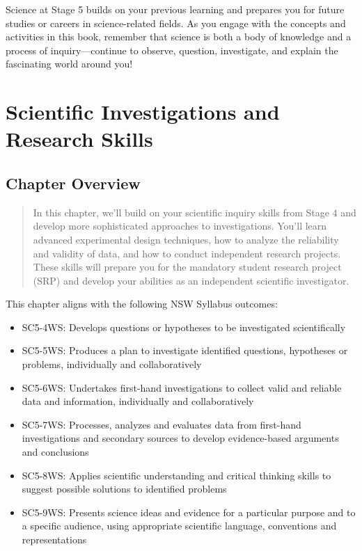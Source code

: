 \documentclass[justified,notoc]{tufte-book}
\begin{document}
Science at Stage 5 builds on your previous learning and prepares you for future studies or careers in science-related fields. As you engage with the concepts and activities in this book, remember that science is both a body of knowledge and a process of inquiry—continue to observe, question, investigate, and explain the fascinating world around you!

\chapter{Scientific Investigations and Research Skills}

\section*{Chapter Overview}

\begin{quote}
    In this chapter, we'll build on your scientific inquiry skills from Stage 4 and develop more sophisticated approaches to investigations. You'll learn advanced experimental design techniques, how to analyze the reliability and validity of data, and how to conduct independent research projects. These skills will prepare you for the mandatory student research project (SRP) and develop your abilities as an independent scientific investigator.
\end{quote}

\noindent This chapter aligns with the following NSW Syllabus outcomes:
\begin{itemize}
    \item SC5-4WS: Develops questions or hypotheses to be investigated scientifically
    \item SC5-5WS: Produces a plan to investigate identified questions, hypotheses or problems, individually and collaboratively
    \item SC5-6WS: Undertakes first-hand investigations to collect valid and reliable data and information, individually and collaboratively
    \item SC5-7WS: Processes, analyzes and evaluates data from first-hand investigations and secondary sources to develop evidence-based arguments and conclusions
    \item SC5-8WS: Applies scientific understanding and critical thinking skills to suggest possible solutions to identified problems
    \item SC5-9WS: Presents science ideas and evidence for a particular purpose and to a specific audience, using appropriate scientific language, conventions and representations
\end{itemize}
\end{document}
